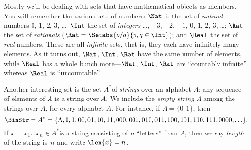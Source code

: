 \documentclass[../../include/open-logic-section]{subfiles}
\begin{document}

\begin{ex}
Mostly we'll be dealing with sets that have mathematical objects as
members. You will remember the various sets of numbers: $\Nat$
is the set of \emph{natural} numbers $0$, $1$, $2$, $3$, \dots{};
$\Int$ the set of \emph{integers} \ldots{}, $-3$, $-2$,
$-1$, $0$, $1$, $2$, $3$, \ldots{}; $\Rat$ the set of
\emph{rationals} ($\Rat = \Setabs{p/q}{p,q\in \Int}$); and
$\Real$ the set of \emph{real} numbers. These are all \emph{infinite}
sets, that is, they each have infinitely many elements. As it turns
out, $\Nat$, $\Int$, $\Rat$ have the same number
of elements, while $\Real$ has a whole bunch more---$\Nat$,
$\Int$, $\Rat$ are ``countably infinite'' whereas
$\Real$ is ``uncountable''.
\end{ex}

\begin{ex}[Strings]
Another interesting set is the set $A^{*}$of
\emph{strings} over an alphabet $A$: any sequence of elements of
$A$ is a string over $A$. We include the \emph{empty string $\Lambda$}
among the strings over $A$, for every alphabet $A$. For instance,
if $A=\{0,1\}$, then 
\[
\BinStr = A^{*}
=\{\Lambda,0,1,00,01,10,11,000,001,010,011,100,101,110,111,0000,\ldots\}.
\]
 If $x=x_{1}\ldots x_{n}\in A^{*}$is a string consisting of $n$
``letters'' from $A$, then we say \emph{length} of the string is~$n$
and write $\len{x}=n$.
\end{ex}
\end{document}
